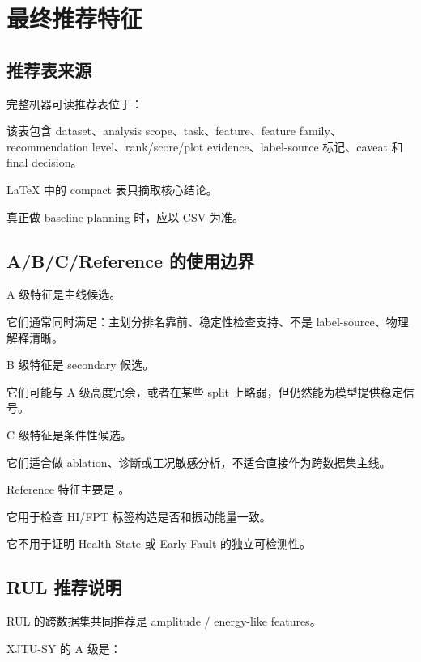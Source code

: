 \section{最终推荐特征}

\subsection{推荐表来源}

完整机器可读推荐表位于：

\begin{center}
\end{center}

该表包含 dataset、analysis scope、task、feature、feature family、recommendation level、rank/score/plot evidence、label-source 标记、caveat 和 final decision。

LaTeX 中的 compact 表只摘取核心结论。

真正做 baseline planning 时，应以 CSV 为准。



\subsection{A/B/C/Reference 的使用边界}

A 级特征是主线候选。

它们通常同时满足：主划分排名靠前、稳定性检查支持、不是 label-source、物理解释清晰。

B 级特征是 secondary 候选。

它们可能与 A 级高度冗余，或者在某些 split 上略弱，但仍然能为模型提供稳定信号。

C 级特征是条件性候选。

它们适合做 ablation、诊断或工况敏感分析，不适合直接作为跨数据集主线。

Reference 特征主要是 。

它用于检查 HI/FPT 标签构造是否和振动能量一致。

它不用于证明 Health State 或 Early Fault 的独立可检测性。

\subsection{RUL 推荐说明}

RUL 的跨数据集共同推荐是 amplitude / energy-like features。

XJTU-SY 的 A 级是：

